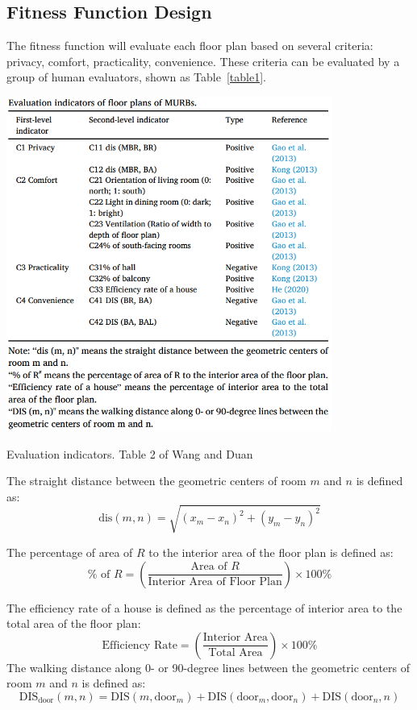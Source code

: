 \documentclass[]{article}
\begin{document}
\subsection{Fitness Function Design}
The fitness function will evaluate each floor plan based on several criteria: 
privacy, comfort, practicality, convenience.
These criteria can be evaluated by a group of human evaluators, shown as Table~\ref{table1}.
\begin{table}[h]
  \centering
  \includegraphics[width=0.8\textwidth]{image1.png}
  \caption{Evaluation indicators. Table 2 of Wang and Duan\cite{WANG2023100238}}\label{table1}
\end{table}

The straight distance between the geometric centers of room $m$ and $n$ is defined as:
\begin{equation*}
\text{dis}(m, n) = \sqrt{(x_m - x_n)^2 + (y_m - y_n)^2}
\end{equation*}

The percentage of area of $R$ to the interior area of the floor plan is defined as:
\begin{equation*}
\% \text{ of } R = \left( \frac{\text{Area of } R}{\text{Interior Area of Floor Plan}} \right) \times 100\%
\end{equation*}

The efficiency rate of a house is defined as the percentage of interior area to the total area of the floor plan:
\begin{equation*}
\text{Efficiency Rate} = \left( \frac{\text{Interior Area}}{\text{Total Area}} \right) \times 100\%
\end{equation*}
The walking distance along 0- or 90-degree lines between the geometric centers of room $m$ and $n$ is defined as:
\begin{equation*}
\text{DIS}_{\text{door}}(m, n) = \text{DIS}(m, \text{door}_m) + \text{DIS}(\text{door}_m, \text{door}_n) + \text{DIS}(\text{door}_n, n)
\end{equation*}
\end{document}
